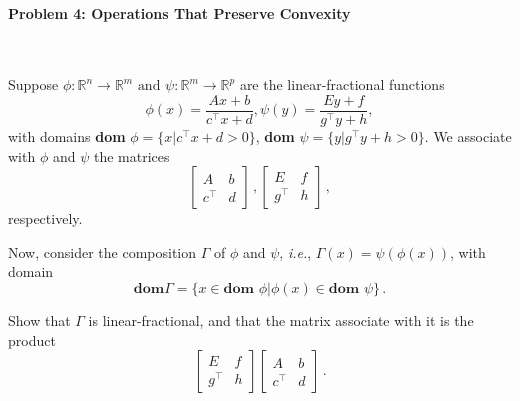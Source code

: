 \documentclass[a4paper]{article}
\begin{document}
\paragraph{Problem 4: Operations That Preserve Convexity}
~

Suppose $\phi : \mathbb{R}^n \rightarrow \mathbb{R}^m \text{ and } \psi : \mathbb{R}^m \rightarrow \mathbb{R}^p$ are the linear-fractional functions
\begin{equation}
\phi(x) = \frac{Ax+b}{c^\top x + d}, \psi(y) = \frac{Ey+f}{g^\top y + h},
\end{equation}
with domains \textbf{dom }$\phi = \{ x | c^\top x + d > 0 \}$, \textbf{dom }$\psi = \{ y | g^\top y + h > 0 \}$. We associate with $\phi$ and $\psi$ the matrices
\begin{equation}
  \left[\begin{matrix}
   A & b \\
   c^\top & d
  \end{matrix}\right]\,,
  \left[\begin{matrix}
   E & f \\
   g^\top & h
  \end{matrix}\right]\,,
\end{equation}
respectively.

Now, consider the composition $\Gamma$ of $\phi$ and $\psi$, \emph{i.e.}, $\Gamma(x)=\psi(\phi(x))$, with domain
\begin{equation}
\textbf{dom} \Gamma = \{ x \in \textbf{dom } \phi | \phi(x) \in \textbf{dom } \psi\} \,.
\end{equation}

Show that $\Gamma$ is linear-fractional, and that the matrix associate with it is the product
\begin{equation}
  \left[\begin{matrix}
   E & f \\
   g^\top & h
  \end{matrix}\right]
  \left[\begin{matrix}
   A & b \\
   c^\top & d
  \end{matrix}\right]\,.
\end{equation}
\end{document}
